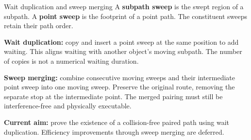 \begin{frame}{Wait duplication and sweep merging}
\small
A \textbf{subpath sweep} is the swept region of a subpath. A \textbf{point sweep} is the footprint of a point path.
The constituent sweeps retain their path order.
\begin{center}\end{center}
\textbf{Wait duplication:} copy and insert a point sweep at the same position to add waiting.
This aligns waiting with another object's moving subpath. The number of copies is not a numerical waiting duration.
\par\medskip
\textbf{Sweep merging:} combine consecutive moving sweeps and their intermediate point sweep into one moving sweep.
Preserve the original route, removing the separate stop at the intermediate point.
The merged pairing must still be interference-free and physically executable.
\par\medskip
\textbf{Current aim:} prove the existence of a collision-free paired path using wait duplication.
Efficiency improvements through sweep merging are deferred.
\end{frame}


